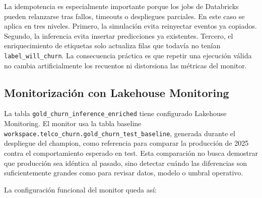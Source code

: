 \documentclass[12pt,a4paper]{article}
\begin{document}
La idempotencia es especialmente importante porque los jobs de Databricks pueden relanzarse tras fallos, timeouts o despliegues parciales. En este caso se aplica en tres niveles. Primero, la simulación evita reinyectar eventos ya copiados. Segundo, la inferencia evita insertar predicciones ya existentes. Tercero, el enriquecimiento de etiquetas solo actualiza filas que todavía no tenían \nolinkurl{label_will_churn}. La consecuencia práctica es que repetir una ejecución válida no cambia artificialmente los recuentos ni distorsiona las métricas del monitor.\par

\subsection{Monitorización con Lakehouse Monitoring}

La tabla \nolinkurl{gold_churn_inference_enriched} tiene configurado Lakehouse Monitoring. El monitor usa la tabla baseline \nolinkurl{workspace.telco_churn.gold_churn_test_baseline}, generada durante el despliegue del champion, como referencia para comparar la producción de 2025 contra el comportamiento esperado en test. Esta comparación no busca demostrar que producción sea idéntica al pasado, sino detectar cuándo las diferencias son suficientemente grandes como para revisar datos, modelo o umbral operativo.\par

La configuración funcional del monitor queda así:\par
\end{document}
